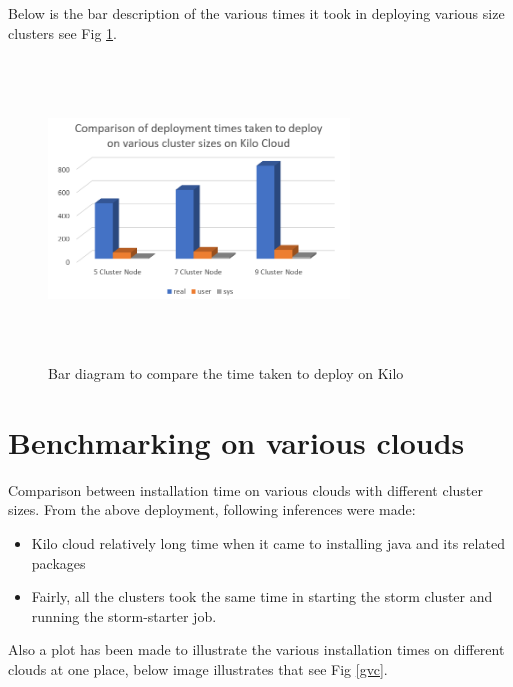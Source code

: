 \documentclass[9pt,twocolumn,twoside]{../../styles/osajnl}
\begin{document}
Below is the bar description of the various times it took in deploying various size clusters see Fig \ref{i:timekilo}.

\begin{figure}[!htb]
  \includegraphics[width=8cm,height=8cm,keepaspectratio,width=\linewidth]{images/bar-3.png}
  \caption{Bar diagram to compare the time taken to deploy on Kilo}
  \label{i:timekilo}
\end{figure}

\section{Benchmarking on various clouds}

Comparison between installation time on various clouds with different cluster sizes. From the above deployment, following inferences were made:

\begin{itemize}
\item Kilo cloud relatively long time when it came to installing java and its related packages
\item Fairly, all the clusters took the same time in starting the storm cluster and running the storm-starter job.
\end{itemize}


Also a plot has been made to illustrate the various installation times on different clouds at one place, below image illustrates that see Fig \ref{gvc}.
\end{document}
